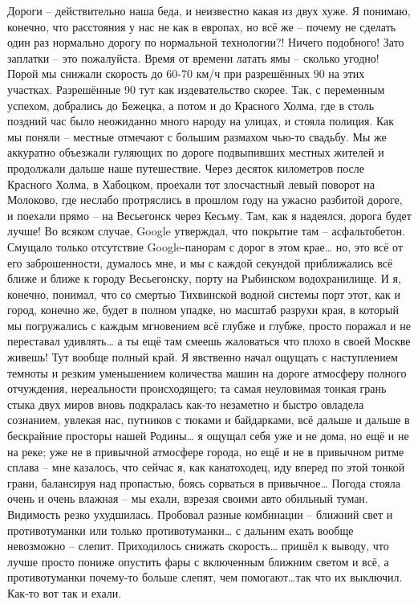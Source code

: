 Дороги – действительно наша беда, и неизвестно какая из двух хуже. Я понимаю, конечно, что расстояния у нас не как в европах, но всё же – почему не сделать один раз нормально дорогу по нормальной технологии?! Ничего подобного! Зато заплатки – это пожалуйста. Время от времени латать ямы – сколько угодно! Порой мы снижали скорость до 60-70 км/ч при разрешённых 90 на этих участках. Разрешённые 90 тут как издевательство скорее. Так, с переменным успехом, добрались до Бежецка, а потом и до Красного Холма, где в столь поздний час было неожиданно много народу на улицах, и стояла полиция. Как мы поняли – местные отмечают с большим размахом чью-то свадьбу. Мы же аккуратно объезжали гуляющих по дороге подвыпивших местных жителей и продолжали дальше наше путешествие. 
Через десяток километров после Красного Холма, в Хабоцком, проехали тот злосчастный левый поворот на Молоково, где неслабо протряслись в прошлом году на ужасно разбитой дороге, и поехали прямо – на Весьегонск через Кесьму. Там, как я надеялся, дорога будет лучше! Во всяком случае, Google утверждал, что покрытие там – асфальтобетон. Смущало только отсутствие Google-панорам с дорог в этом крае… но, это всё от его заброшенности, думалось мне, и мы с каждой секундой приближались всё ближе и ближе к городу Весьегонску, порту на Рыбинском водохранилище. И я, конечно, понимал, что со смертью Тихвинской водной системы порт этот, как и город, конечно же, будет в полном упадке, но масштаб разрухи края, в который мы погружались с каждым мгновением всё глубже и глубже, просто поражал и не переставал удивлять… а ты ещё там смеешь жаловаться что плохо в своей Москве живешь! Тут вообще полный край. Я явственно начал ощущать с наступлением темноты и резким уменьшением количества машин на дороге атмосферу полного отчуждения, нереальности происходящего; та самая неуловимая тонкая грань стыка двух миров вновь подкралась как-то незаметно и быстро овладела сознанием, увлекая нас, путников с тюками и байдарками, всё дальше и дальше в бескрайние просторы нашей Родины… я ощущал себя уже и не дома, но ещё и не на реке; уже не в привычной атмосфере города, но ещё и не в привычном ритме сплава – мне казалось, что сейчас я, как канатоходец, иду вперед по этой тонкой грани, балансируя над пропастью, боясь сорваться в привычное…
Погода стояла очень и очень влажная – мы ехали, взрезая своими авто обильный туман. Видимость резко ухудшилась. Пробовал разные комбинации – ближний свет и противотуманки или только противотуманки… с дальним ехать вообще невозможно – слепит. Приходилось снижать скорость… пришёл к выводу, что лучше просто пониже опустить фары с включенным ближним светом и всё, а противотуманки почему-то больше слепят, чем помогают…так что их выключил. Как-то вот так и ехали. 
